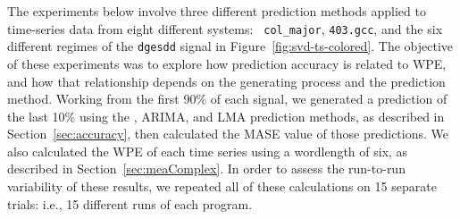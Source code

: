 







The experiments below involve three different prediction methods
applied to time-series data from eight different systems: {\tt
  col\_major}, {\tt 403.gcc}, and the six different regimes of the
{\tt dgesdd} signal in Figure~\ref{fig:svd-ts-colored}.  The objective of these
experiments was to explore how prediction accuracy is related to WPE,
and how that relationship depends on the generating process and the
prediction method.  Working from the first 90\% of each signal, we
generated a prediction of the last 10\% using the \naive, ARIMA, and
LMA prediction methods, as described in Section~\ref{sec:accuracy},
then calculated the MASE value of those predictions.  We also
calculated the WPE of each time series using a wordlength of six, as
described in Section~\ref{sec:meaComplex}.  In order to assess the
run-to-run variability of these results, we repeated all of these
calculations on 15 separate trials: i.e., 15 different runs of each
program.  

